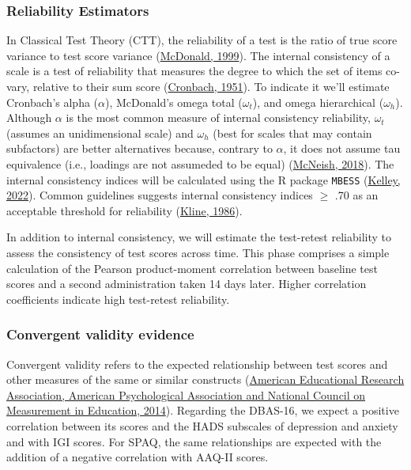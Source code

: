 \documentclass[
  ,doc,11pt, twoside,floatsintext]{apa6}
\begin{document}
\hypertarget{reliability-estimators}{%
\subsubsection{Reliability Estimators}\label{reliability-estimators}}

In Classical Test Theory (CTT), the reliability of a test is the ratio of true score variance to test score variance (\protect\hyperlink{ref-mcdonald1999}{McDonald, 1999}). The internal consistency of a scale is a test of reliability that measures the degree to which the set of items co-vary, relative to their sum score (\protect\hyperlink{ref-cronbach1951}{Cronbach, 1951}). To indicate it we'll estimate Cronbach's alpha (\(\alpha\)), McDonald's omega total (\(\omega_t\)), and omega hierarchical (\(\omega_h\)). Although \(\alpha\) is the most common measure of internal consistency reliability, \(\omega_t\) (assumes an unidimensional scale) and \(\omega_h\) (best for scales that may contain subfactors) are better alternatives because, contrary to \(\alpha\), it does not assume tau equivalence (i.e., loadings are not assumeded to be equal) (\protect\hyperlink{ref-mcneish2018}{McNeish, 2018}). The internal consistency indices will be calculated using the R package \texttt{MBESS} (\protect\hyperlink{ref-MBESS}{Kelley, 2022}). Common guidelines suggests internal consistency indices \(\ge\) .70 as an acceptable threshold for reliability (\protect\hyperlink{ref-kline1986}{Kline, 1986}).

In addition to internal consistency, we will estimate the test-retest reliability to assess the consistency of test scores across time. This phase comprises a simple calculation of the Pearson product-moment correlation between baseline test scores and a second administration taken 14 days later. Higher correlation coefficients indicate high test-retest reliability.

\hypertarget{convergent-validity-evidence}{%
\subsubsection{Convergent validity evidence}\label{convergent-validity-evidence}}

Convergent validity refers to the expected relationship between test scores and other measures of the same or similar constructs (\protect\hyperlink{ref-standards2014}{American Educational Research Association, American Psychological Association and National Council on Measurement in Education, 2014}). Regarding the DBAS-16, we expect a positive correlation between its scores and the HADS subscales of depression and anxiety and with IGI scores. For SPAQ, the same relationships are expected with the addition of a negative correlation with AAQ-II scores.
\end{document}
